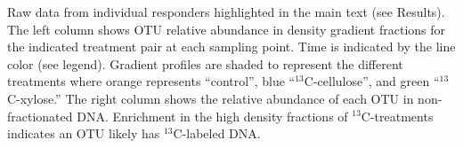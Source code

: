 Raw data from individual responders highlighted in the main text (see
Results). The left column shows OTU relative abundance in density gradient 
fractions for the indicated treatment pair at each sampling point. Time is
indicated by the line color (see legend). Gradient profiles are shaded
to represent the different treatments where orange represents ``control'',
blue ``$^{13}$C-cellulose'', and green ``$^{13}$C-xylose.'' The right column
shows the relative abundance of each OTU in non-fractionated DNA. Enrichment in the
high density fractions of $^{13}$C-treatments indicates an OTU likely
has $^{13}$C-labeled DNA. 

